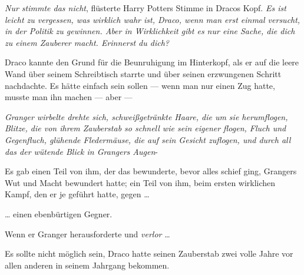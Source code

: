 \emph{Nur stimmte das nicht}, flüsterte Harry Potters Stimme in Dracos Kopf. \emph{Es ist leicht zu vergessen, was wirklich wahr ist, Draco, wenn man erst einmal versucht, in der Politik zu gewinnen. Aber in Wirklichkeit gibt es nur eine Sache, die dich zu einem Zauberer macht. Erinnerst du dich?}

Draco kannte den Grund für die Beunruhigung im Hinterkopf, als er auf die leere Wand über seinem Schreibtisch starrte und über seinen erzwungenen Schritt nachdachte. Es hätte einfach sein sollen — wenn man nur einen Zug hatte, musste man ihn machen — aber —

\emph{Granger wirbelte drehte sich, schweißgetränkte Haare, die um sie herumflogen, Blitze, die von ihrem Zauberstab so schnell wie sein eigener flogen, Fluch und Gegenfluch, glühende Fledermäuse, die auf sein Gesicht zuflogen, und durch all das der wütende Blick in Grangers Augen}-

Es gab einen Teil von ihm, der das bewunderte, bevor alles schief ging, Grangers Wut und Macht bewundert hatte; ein Teil von ihm, beim ersten wirklichen Kampf, den er je geführt hatte, gegen …

… einen ebenbürtigen Gegner.

Wenn er Granger herausforderte und \emph{verlor} …

Es sollte nicht möglich sein, Draco hatte seinen Zauberstab zwei volle Jahre vor allen anderen in seinem Jahrgang bekommen.

